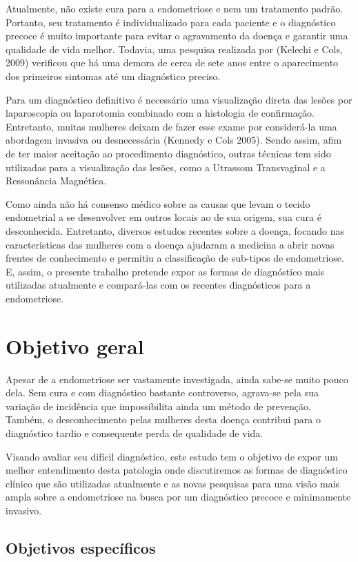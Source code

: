\documentclass[12pt]{article} %
\begin{document}
Atualmente, não existe cura para a endometriose e nem um tratamento
padrão. Portanto, seu tratamento é individualizado para cada paciente
e o diagnóstico precoce é muito importante para evitar o agravamento
da doença e garantir uma qualidade de vida melhor.  Todavia, uma
pesquisa realizada por (Kelechi e Cols, 2009) verificou que há uma
demora de cerca de sete anos entre o aparecimento dos primeiros
sintomas até um diagnóstico preciso.

Para um diagnóstico definitivo é necessário uma visualização direta
das lesões por laparoscopia ou laparotomia combinado com a histologia
de confirmação. Entretanto, muitas mulheres deixam de fazer esse exame
por considerá-la uma abordagem invasiva ou desnecessária (Kennedy e
Cols 2005).  Sendo assim, afim de ter maior aceitação ao procedimento
diagnóstico, outras técnicas tem sido utilizadas para a visualização
das lesões, como a Utrassom Transvaginal e a Ressonância Magnética.

Como ainda não há consenso médico sobre as causas que levam o tecido
endometrial a se desenvolver em outros locais ao de sua origem, sua
cura é desconhecida. Entretanto, diversos estudos recentes sobre a
doença, focando nas características das mulheres com a doença ajudaram
a medicina a abrir novas frentes de conhecimento e permitiu a
classificação de sub-tipos de endometriose. E, assim, o presente
trabalho pretende expor as formas de diagnóstico mais utilizadas
atualmente e compará-las com os recentes diagnósticos para a
endometriose.

\section{Objetivo geral}

Apesar de a endometriose ser vastamente investigada, ainda sabe-se
muito pouco dela. Sem cura e com diagnóstico bastante controverso,
agrava-se pela sua variação de incidência que impossibilita ainda um
método de prevenção. Também, o desconhecimento pelas mulheres desta
doença contribui para o diagnóstico tardio e consequente perda de
qualidade de vida.

Visando avaliar seu difícil diagnóstico, este estudo tem o objetivo de
expor um melhor entendimento desta patologia onde discutiremos as
formas de diagnóstico clínico que são utilizadas atualmente e as novas
pesquisas para uma visão mais ampla sobre a endometriose na busca por
um diagnóstico precoce e minimamente invasivo.

\subsection{Objetivos específicos}
\end{document}
